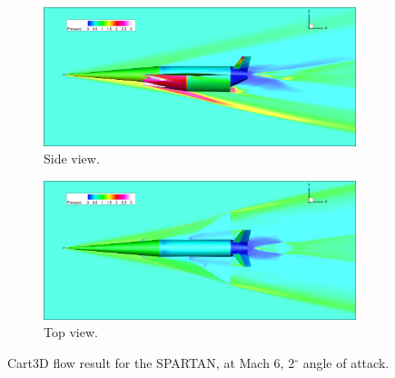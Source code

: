 \begin{figure}[ht]
\begin{subfigure}{.9\textwidth}
	\centering
	\includegraphics[width=0.9\linewidth]{figures/3_vehicle_design/CartSide}
	\caption{Side view.}
	\label{fig:CartSide}
\end{subfigure}

\begin{subfigure}{.9\textwidth}
	\centering
	\includegraphics[width=0.9\linewidth]{figures/3_vehicle_design/CartTop}
	\caption{Top view.}
	\label{fig:CartTop}
\end{subfigure}
\caption{Cart3D flow result for the SPARTAN, at Mach 6, 2$^\circ$ angle of attack.}
\label{fig:CartSPART}
\end{figure}

